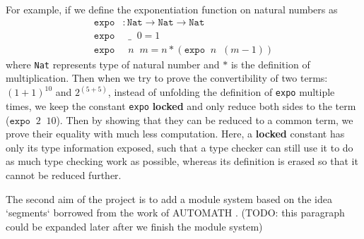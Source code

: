 \documentclass{article}
\theoremstyle{remark}
\begin{document}
For example, if we define the exponentiation function on natural numbers as
\begin{align*}
  \texttt{expo} &: \texttt{Nat} \to \texttt{Nat} \to \texttt{Nat} \\
  \texttt{expo} &\;\; \_\;\; 0 = 1 \\
  \texttt{expo} &\;\; n \;\; m = n * (\texttt{expo} \;\; n \;\; (m - 1))
\end{align*}
where \texttt{Nat} represents type of natural number and $*$ is the definition of multiplication. Then when we try to prove the convertibility of two terms: $(1 + 1)^{10}$ and $2 ^ {(5+5)}$, instead of unfolding the definition of \texttt{expo} multiple times, we keep the constant \texttt{expo} \textbf{locked} and only reduce both sides to the term ($\texttt{expo} \;\; 2 \;\; 10$). Then by showing that they can be reduced to a common term, we prove their equality with much less computation. Here, a \textbf{locked} constant has only its type information exposed, such that a type checker can still use it to do as much type checking work as possible, whereas its definition is erased so that it cannot be reduced further.

The second aim of the project is to add a module system based on the idea `segments` borrowed from the work of AUTOMATH \cite{de1994survey}. (TODO: this paragraph could be expanded later after we finish the module system)
\end{document}
